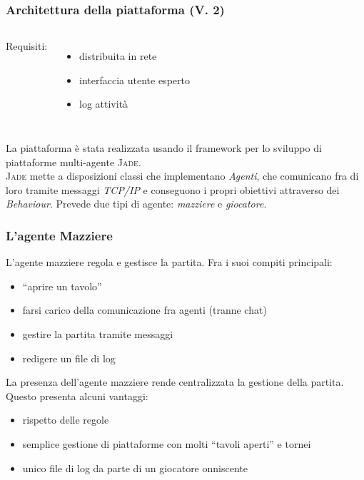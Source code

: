 \documentclass{beamer}
\newcommand*\lista{\item[$\diamondsuit$]}
\begin{document}

\begin{frame}
   \frametitle{Architettura della piattaforma (V. 2)}
   \begin{columns}

   Requisiti:
   \begin{itemize}
      \lista distribuita in rete
      \lista interfaccia utente esperto
      \lista log attività
   \end{itemize}



   \begin{center}
   \begin{figure}      
   \end{figure}
   \end{center}

   \end{columns}
   
   \vfill
   \pause

   La piattaforma è stata realizzata usando il framework per lo sviluppo di piattaforme multi-agente \textsc{Jade}.\\
   \textsc{Jade} mette a disposizioni classi che implementano \emph{Agenti}, che comunicano fra di loro tramite messaggi \emph{TCP/IP} e conseguono i propri obiettivi attraverso dei \emph{Behaviour}.
   \vfill
   Prevede due tipi di agente: \emph{mazziere} e \emph{giocatore}.
   \vfill

\end{frame}




\begin{frame}
   \frametitle{L'agente Mazziere}
   L'agente mazziere regola e gestisce la partita. Fra i suoi compiti principali:
   \begin{itemize}
      \pause
      \lista ``aprire un tavolo'' 
      \pause
      \lista farsi carico della comunicazione fra agenti (tranne chat)
      \pause
      \lista gestire la partita tramite messaggi
      \pause
      \lista redigere un file di log
   \end{itemize}
   \vfill
   \pause
   La presenza dell'agente mazziere rende centralizzata la gestione della partita. 
   Questo presenta alcuni vantaggi:
   \begin{itemize}
      \pause
      \lista rispetto delle regole
      \pause
      \lista semplice gestione di piattaforme con molti ``tavoli aperti'' e tornei
      \pause
      \lista unico file di log da parte di un giocatore onniscente
   \end{itemize}
\end{frame}
\end{document}
